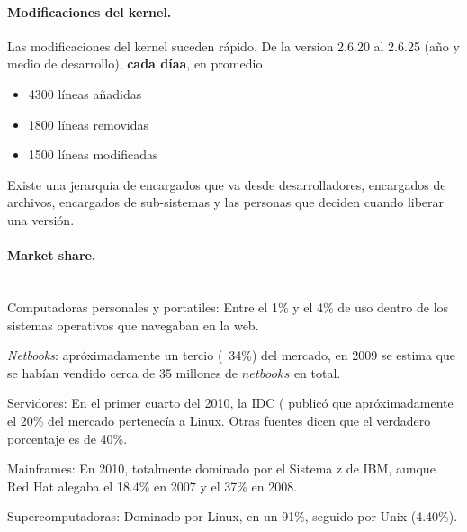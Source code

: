 \documentclass[spanish]{article}
\begin{document}
\paragraph{Modificaciones del kernel. }
Las modificaciones del kernel suceden rápido. De la version 2.6.20 al 2.6.25 (a\~{n}o y medio de desarrollo), \textbf{cada díaa}, en promedio 
\begin{itemize}
	\item 4300 l\'{i}neas añadidas 
	\item 1800 l\'{i}neas removidas
	\item 1500 l\'{i}neas modificadas
\end{itemize}

Existe una jerarquía de encargados que va desde desarrolladores, encargados de archivos, encargados de sub-sistemas y las personas que deciden cuando liberar una versión.

\paragraph{Market share.}\\
Computadoras personales y portatiles: Entre el 1\% y el 4\% de uso dentro de los sistemas operativos que navegaban en la web.

\textit{Netbooks}: apróximadamente un tercio (~34\%) del mercado, en 2009 se estima que se habían vendido cerca de 35 millones de $netbooks$ en total. 

Servidores:  En el primer cuarto del 2010, la IDC ( publicó que apróximadamente el 20\% del mercado pertenecía a Linux.  Otras fuentes dicen que el verdadero porcentaje es de 40\%.

Mainframes: En 2010, totalmente dominado por el Sistema z de IBM, aunque Red Hat alegaba el 18.4\% en 2007 y el 37\% en 2008.

Supercomputadoras: Dominado por Linux, en un 91\%, seguido por Unix (4.40\%).
\end{document}
